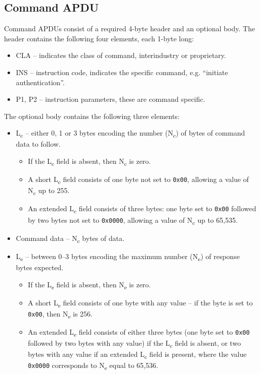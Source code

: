 \documentclass[12pt,a4paper,twoside,openright]{report}
\begin{document}
\subsection{Command APDU}

Command APDUs consist of a required 4-byte header and an optional body. The header contains the following four elements, each 1-byte long:

\begin{itemize}
\item CLA -- indicates the class of command, interindustry or proprietary.
\item INS -- instruction code, indicates the specific command, e.g. ``initiate authentication''.
\item P1, P2 -- instruction parameters, these are command specific.
\end{itemize}

\noindent
The optional body contains the following three elements:

\begin{itemize}
\item L\textsubscript{c} -- either 0, 1 or 3 bytes encoding the number (N\textsubscript{c}) of bytes of command data to follow.
	\begin{itemize}
	\item If the L\textsubscript{c} field is absent, then N\textsubscript{c} is zero.
	\item A short L\textsubscript{c} field consists of one byte not set to \texttt{0x00}, allowing a value of N\textsubscript{c} up to 255.
	\item An extended L\textsubscript{c} field consists of three bytes: one byte set to \texttt{0x00} followed by two bytes not set to \texttt{0x0000}, allowing a value of N\textsubscript{c} up to 65,535.
	\end{itemize}
\item Command data -- N\textsubscript{c} bytes of data.
\item L\textsubscript{e} -- between 0--3 bytes encoding the maximum number (N\textsubscript{e}) of response bytes expected.
	\begin{itemize}
	\item If the L\textsubscript{e} field is absent, then N\textsubscript{e} is zero.
	\item A short L\textsubscript{e} field consists of one byte with any value -- if the byte is set to \texttt{0x00}, then N\textsubscript{e} is 256.
	\item An extended L\textsubscript{e} field consists of either three bytes (one byte set to \texttt{0x00} followed by two bytes with any value) if the L\textsubscript{c} field is absent, or two bytes with any value if an extended L\textsubscript{c} field is present, where the value \texttt{0x0000} corresponds to N\textsubscript{e} equal to 65,536.
	\end{itemize}
\end{itemize}
\end{document}
